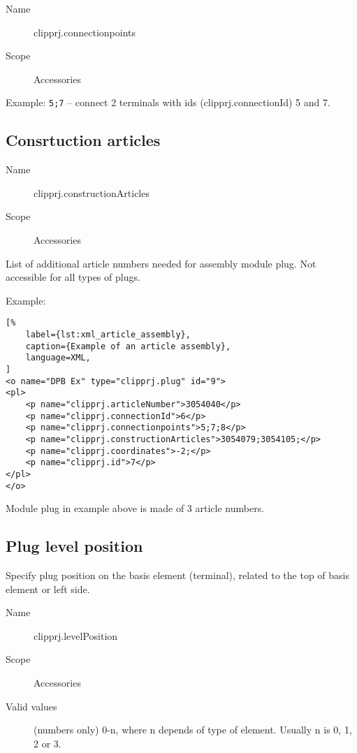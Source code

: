 \documentclass[%
	a4paper,
	oneside,
	listof=numbered,
	parskip=half,
	headsepline=true,
	footsepline=false,
	0.7headlines,
	]{scrbook}
\begin{document}
\begin{description}
	\item[Name] clipprj.connectionpoints
	\item[Scope] Accessories
\end{description}

Example: \verb|5;7| – connect 2 terminals with ids (clipprj.connectionId) 5 and 7.

\subsection{Consrtuction articles}

\begin{description}
	\item[Name] clipprj.constructionArticles
	\item[Scope] Accessories
\end{description}

List of additional article numbers needed for assembly module plug.
Not accessible for all types of plugs.

Example:

\begin{lstlisting}[%
	label={lst:xml_article_assembly},
	caption={Example of an article assembly},
	language=XML,
]
<o name="DPB Ex" type="clipprj.plug" id="9">
<pl>
	<p name="clipprj.articleNumber">3054040</p>
	<p name="clipprj.connectionId">6</p>
	<p name="clipprj.connectionpoints">5;7;8</p>
	<p name="clipprj.constructionArticles">3054079;3054105;</p>
	<p name="clipprj.coordinates">-2;</p>
	<p name="clipprj.id">7</p>
</pl>
</o>
\end{lstlisting}

Module plug in example above is made of 3 article numbers.

\subsection{Plug level position}

Specify plug position on the basis element (terminal), related to the top of
basis element or left side.

\begin{description}
	\item[Name] clipprj.levelPosition
	\item[Scope] Accessories
	\item[Valid values] (numbers only) 0-n, where n depends of type of element.
	Usually n is 0, 1, 2 or 3.
\end{description}
\end{document}
